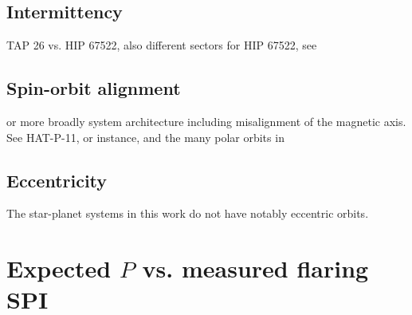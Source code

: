 \documentclass[twocolumn]{aastex631}
\begin{document}
\subsection{Intermittency}
\label{sec:discussion:intermittency}
TAP 26 vs. HIP 67522, also different sectors for HIP 67522, see \cite{shkolnik2008nature}

\subsection{Spin-orbit alignment}
or more broadly system architecture including misalignment of the magnetic axis. See HAT-P-11, or instance, and the many polar orbits in \cite{bourrier2023dream}
\subsection{Eccentricity}
The star-planet systems in this work do not have notably eccentric orbits.


\appendix
\section{Expected $P$ vs. measured flaring SPI}
\end{document}
